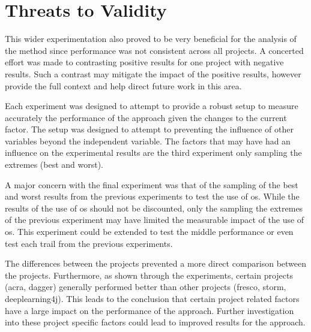 \clearpage
\section{Threats to Validity}
\label{sec:threat_validity}

This wider experimentation also proved to be very beneficial for the analysis of the method since performance was not consistent across all projects. A concerted effort was made to contrasting positive results for one project with negative results. Such a contrast may mitigate the impact of the positive results, however provide the full context and help direct future work in this area.

Each experiment was designed to attempt to provide a robust setup to measure accurately the performance of the approach given the changes to the current factor. The setup was designed to attempt to preventing the influence of other variables beyond the independent variable. The factors that may have had an influence on the experimental results are the third experiment only sampling the extremes (best and worst).

A major concern with the final experiment was that of the sampling of the best and worst results from the previous experiments to test the use of \gls{os}. While the results of the use of \gls{os} should not be discounted, only the sampling the extremes of the previous experiment may have limited the measurable impact of the use of \gls{os}. This experiment could be extended to test the middle performance or even test each trail from the previous experiments.

The differences between the projects prevented a more direct comparison between the projects. Furthermore, as shown through the experiments, certain projects (acra, dagger) generally performed better than other projects (fresco, storm, deeplearning4j). This leads to the conclusion that certain project related factors have a large impact on the performance of the approach. Further investigation into these project specific factors could lead to improved results for the approach.